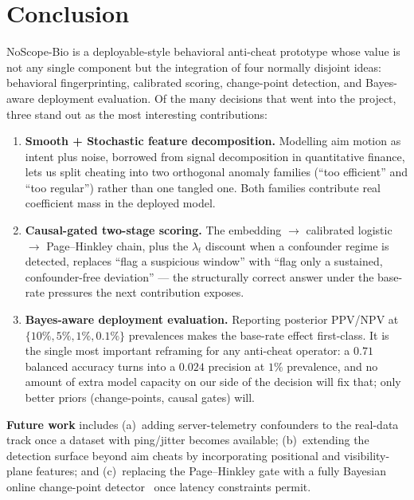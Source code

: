 \documentclass[conference,10pt]{IEEEtran}
\begin{document}
\section{Conclusion}

NoScope-Bio is a deployable-style behavioral anti-cheat prototype whose
value is not any single component but the integration of four normally
disjoint ideas: behavioral fingerprinting, calibrated scoring,
change-point detection, and Bayes-aware deployment evaluation. Of the
many decisions that went into the project, three stand out as the most
interesting contributions:

\begin{enumerate}
  \item \textbf{Smooth + Stochastic feature decomposition.} Modelling
    aim motion as intent plus noise, borrowed from signal decomposition
    in quantitative finance, lets us split cheating into two orthogonal
    anomaly families (``too efficient'' and ``too regular'') rather than
    one tangled one. Both families contribute real coefficient mass in
    the deployed model.
  \item \textbf{Causal-gated two-stage scoring.} The
    embedding $\rightarrow$ calibrated logistic $\rightarrow$ Page--Hinkley
    chain, plus the $\lambda_t$ discount when a confounder regime is
    detected, replaces ``flag a suspicious window'' with ``flag only a
    sustained, confounder-free deviation'' --- the structurally correct
    answer under the base-rate pressures the next contribution exposes.
  \item \textbf{Bayes-aware deployment evaluation.} Reporting posterior
    PPV/NPV at $\{10\%, 5\%, 1\%, 0.1\%\}$ prevalences makes the
    base-rate effect first-class. It is the single most important
    reframing for any anti-cheat operator: a $0.71$ balanced accuracy
    turns into a $0.024$ precision at $1\%$ prevalence, and no amount of
    extra model capacity on our side of the decision will fix that; only
    better priors (change-points, causal gates) will.
\end{enumerate}

\textbf{Future work} includes (a)~adding server-telemetry confounders to
the real-data track once a dataset with ping/jitter becomes available;
(b)~extending the detection surface beyond aim cheats by incorporating
positional and visibility-plane features; and (c)~replacing the
Page--Hinkley gate with a fully Bayesian online
change-point detector~\cite{adams2007bayesian} once latency constraints
permit.
\end{document}
